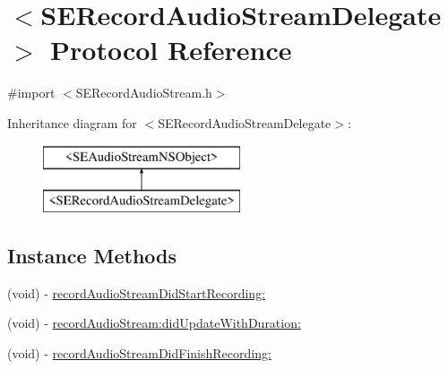 \hypertarget{protocol_s_e_record_audio_stream_delegate-p}{\section{$<$S\-E\-Record\-Audio\-Stream\-Delegate$>$ Protocol Reference}
\label{protocol_s_e_record_audio_stream_delegate-p}
}


{\ttfamily \#import $<$S\-E\-Record\-Audio\-Stream.\-h$>$}

Inheritance diagram for $<$S\-E\-Record\-Audio\-Stream\-Delegate$>$\-:\begin{figure}[H]
\begin{center}
\leavevmode
\includegraphics[height=2.000000cm]{protocol_s_e_record_audio_stream_delegate-p}
\end{center}
\end{figure}
\subsection*{Instance Methods}
\begin{DoxyCompactItemize}
\item 
(void) -\/ \hyperlink{protocol_s_e_record_audio_stream_delegate-p_ad9a82cf4916f8d3dc0450d7904244272}{record\-Audio\-Stream\-Did\-Start\-Recording\-:}
\item 
(void) -\/ \hyperlink{protocol_s_e_record_audio_stream_delegate-p_a6f989682abec086abcf3df35aa465b64}{record\-Audio\-Stream\-:did\-Update\-With\-Duration\-:}
\item 
(void) -\/ \hyperlink{protocol_s_e_record_audio_stream_delegate-p_adfc35cb87b18e6b20e2e02f8894defa8}{record\-Audio\-Stream\-Did\-Finish\-Recording\-:}
\end{DoxyCompactItemize}


